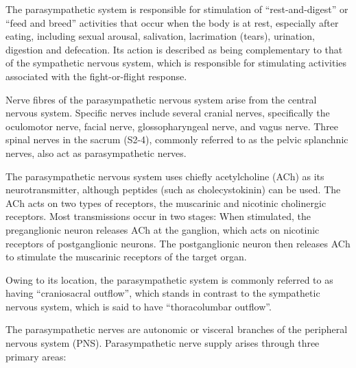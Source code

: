 \documentclass[]{book}
\begin{document}
The parasympathetic system is responsible for stimulation of ``rest-and-digest'' or ``feed and breed'' activities that occur when the body is at rest, especially after eating, including sexual arousal, salivation, lacrimation (tears), urination, digestion and defecation. Its action is described as being complementary to that of the sympathetic nervous system, which is responsible for stimulating activities associated with the fight-or-flight response.

Nerve fibres of the parasympathetic nervous system arise from the central nervous system. Specific nerves include several cranial nerves, specifically the oculomotor nerve, facial nerve, glossopharyngeal nerve, and vagus nerve. Three spinal nerves in the sacrum (S2-4), commonly referred to as the pelvic splanchnic nerves, also act as parasympathetic nerves.

The parasympathetic nervous system uses chiefly acetylcholine (ACh) as its neurotransmitter, although peptides (such as cholecystokinin) can be used. The ACh acts on two types of receptors, the muscarinic and nicotinic cholinergic receptors. Most transmissions occur in two stages: When stimulated, the preganglionic neuron releases ACh at the ganglion, which acts on nicotinic receptors of postganglionic neurons. The postganglionic neuron then releases ACh to stimulate the muscarinic receptors of the target organ.

Owing to its location, the parasympathetic system is commonly referred to as having ``craniosacral outflow'', which stands in contrast to the sympathetic nervous system, which is said to have ``thoracolumbar outflow''.

The parasympathetic nerves are autonomic or visceral  branches of the peripheral nervous system (PNS). Parasympathetic nerve supply arises through three primary areas:
\end{document}

